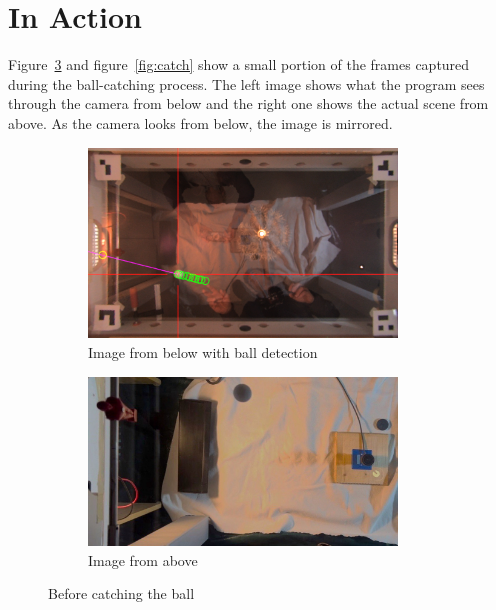 \section{In Action}\label{sec:in-action}
Figure~\ref{fig:before_catch} and figure~\ref{fig:catch} show a small portion of the frames captured during the ball-catching process.
The left image shows what the program sees through the camera from below and the right one shows the actual scene from above.
As the camera looks from below, the image is mirrored.
\begin{figure}[H]
    \centering
    \begin{subfigure}{.5\textwidth}
        \centering
        \includegraphics[width=0.9\textwidth]{../photos/player_before_catch_bottom}
        \caption{Image from below with ball detection}
        \label{fig:player_before_catch_bottom}
    \end{subfigure}%
    \begin{subfigure}{.5\textwidth}
        \centering
        \includegraphics[width=0.9\textwidth]{../photos/before_catch_top}
        \caption{Image from above}
        \label{fig:before_catch_top}
    \end{subfigure}
    \caption{Before catching the ball}
    \label{fig:before_catch}
\end{figure}


